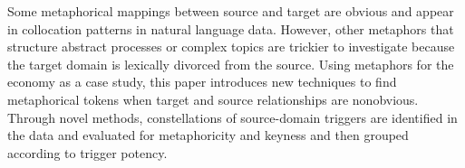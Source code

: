 Some metaphorical mappings between source and target are obvious and appear in collocation patterns in natural language data. However, other metaphors that structure abstract processes or complex topics are trickier to investigate because the target domain is lexically divorced from the source.  Using metaphors for the economy as a case study, this paper introduces new techniques to find metaphorical tokens when target and source relationships are nonobvious. Through novel methods, constellations of source-domain triggers are identified in the data and evaluated for metaphoricity and keyness and then grouped according to trigger potency.

